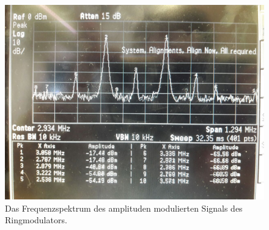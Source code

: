 \begin{figure}
  \centering
  \includegraphics[width=0.7\linewidth]{ressources/photo5384285734183217712.jpg}
  \caption{Das Frequenzspektrum des amplituden modulierten Signals des Ringmodulators.}
  \label{spek1}
\end{figure}

